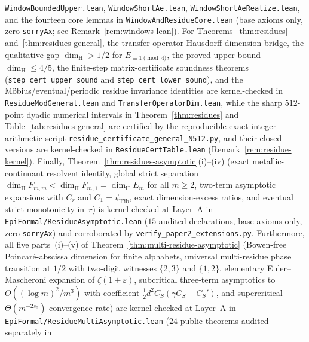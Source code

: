 \documentclass[11pt]{article}
\theoremstyle{definition}
\theoremstyle{remark}
\newcommand{\dimH}{\dim_{\mathrm{H}}}
\begin{document}
\begin{itemize}[leftmargin=1.5em]
\texttt{Window\allowbreak Bounded\allowbreak Upper.lean},
\texttt{Window\allowbreak Short\allowbreak Ae.lean},
\texttt{Window\allowbreak Short\allowbreak Ae\allowbreak Realize.lean}, and the fourteen
core lemmas in \texttt{Window\allowbreak And\allowbreak Residue\allowbreak Core.lean}
(base axioms only, zero \texttt{sorryAx}; see Remark~\ref{rem:windows-lean}).
For Theorems~\ref{thm:residues} and~\ref{thm:residues-general}, the
transfer-operator Hausdorff-dimension bridge, the qualitative gap
$\dimH > 1/2$ for $E_{\equiv 1\pmod 4}$, the proved upper bound
$\dimH \le 4/5$, the finite-step matrix-certificate soundness theorems
(\texttt{step\_\allowbreak cert\_\allowbreak upper\_\allowbreak sound} and
\texttt{step\_\allowbreak cert\_\allowbreak lower\_\allowbreak sound}), and
the M\"obius/eventual/periodic residue invariance identities are kernel-checked
in \texttt{Residue\allowbreak ModGeneral.lean} and
\texttt{Transfer\allowbreak Operator\allowbreak Dim.lean}, while the sharp
$512$-point dyadic numerical intervals in Theorem~\ref{thm:residues} and
Table~\ref{tab:residues-general} are certified by the reproducible exact
integer-arithmetic script \texttt{residue\_\allowbreak certificate\_\allowbreak general\_\allowbreak N512.py},
and their closed versions are kernel-checked in
\texttt{Residue\allowbreak Cert\allowbreak Table.lean} (Remark~\ref{rem:residue-kernel}). Finally,
Theorem~\ref{thm:residues-asymptotic}(i)--(iv) (exact metallic-continuant
resolvent identity, global strict separation $\dimH F_{m,m}<\dimH F_{m,1}=\dimH E_m$
for all $m\ge2$, two-term asymptotic expansions with $C_r$ and $C_1=\psi_{\mathrm{Fib}}$,
exact dimension-excess ratios, and eventual strict monotonicity in~$r$) is
kernel-checked at Layer~A in
\texttt{EpiFormal/\allowbreak Residue\allowbreak Asymptotic.lean} ($15$ audited
declarations, base axioms only, zero \texttt{sorryAx}) and corroborated by
\texttt{verify\_\allowbreak paper2\_\allowbreak extensions.py}. Furthermore,
all five parts~(i)--(v) of Theorem~\ref{thm:multi-residue-asymptotic}
(Bowen-free Poincar\'e-abscissa dimension for finite alphabets, universal
multi-residue phase transition at $1/2$ with two-digit witnesses $\{2,3\}$
and $\{1,2\}$, elementary Euler--Mascheroni expansion of $\zeta(1+\varepsilon)$,
subcritical three-term asymptotics to $O((\log m)^2/m^3)$ with coefficient
$\frac12 d^2 C_S(\gamma C_S-C_S')$, and supercritical $\Theta(m^{-2s_0})$
convergence rate) are kernel-checked at Layer~A in
\texttt{EpiFormal/\allowbreak Residue\allowbreak Multi\allowbreak Asymptotic.lean}
($24$ public theorems audited separately in

\end{itemize}
\end{document}
